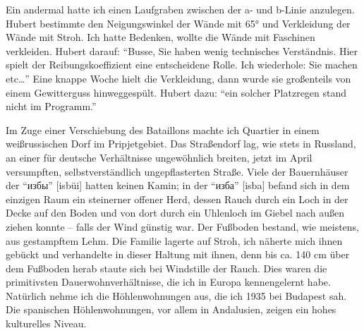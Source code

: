 Ein andermal hatte ich einen Laufgraben zwischen der a- und b-Linie anzulegen. Hubert bestimmte den Neigungswinkel der Wände mit 65° und Verkleidung der Wände mit Stroh. Ich hatte Bedenken, wollte die Wände mit Faschinen verkleiden. Hubert darauf: \enquote{Busse, Sie haben wenig technisches Verständnis. Hier spielt der Reibungskoeffizient eine entscheidene Rolle. Ich wiederhole: Sie machen etc\dots} Eine knappe Woche hielt die Verkleidung, dann wurde sie großenteils von einem Gewitterguss hinweggespült. Hubert dazu: \enquote{ein solcher Platzregen stand nicht im Programm.}

Im Zuge einer Verschiebung des Bataillons machte ich Quartier in einem weißrussischen Dorf im Pripjetgebiet. Das Straßendorf lag, wie stets in Russland, an einer für deutsche Verhältnisse ungewöhnlich breiten, jetzt im April versumpften, selbstverständlich ungepflasterten Straße. Viele der Bauernhäuser der \enquote{избы} [isbüi] hatten keinen Kamin; in der \enquote{изба} [isba] befand sich in dem einzigen Raum ein steinerner offener Herd, dessen Rauch durch ein Loch in der Decke auf den Boden und von dort durch ein Uhlenloch im Giebel nach außen ziehen konnte -- falls der Wind günstig war. Der Fußboden bestand, wie meistens, aus gestampftem Lehm. Die Familie lagerte auf Stroh, ich näherte mich ihnen gebückt und verhandelte in dieser Haltung mit ihnen, denn bis ca. 140 cm über dem Fußboden herab staute sich bei Windstille der Rauch. Dies waren die primitivsten Dauerwohnverhältnisse, die ich in Europa kennengelernt habe. Natürlich nehme ich die Höhlenwohnungen aus, die ich 1935 bei Budapest sah. Die spanischen Höhlenwohnungen, vor allem in Andalusien, zeigen ein hohes kulturelles Niveau.

